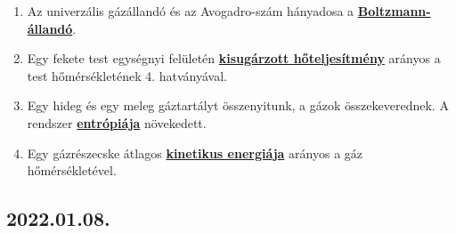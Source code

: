 \documentclass[../../fizika_kerdesek.tex]{subfiles}
\begin{document}
{\begin{enumerate}
                \item Az univerzális gázállandó és az Avogadro-szám hányadosa a \underline{\textbf{Boltzmann-állandó}}.
                \item Egy fekete test egységnyi felületén \underline{\textbf{kisugárzott hőteljesítmény}} arányos a test hőmérsékletének 4. hatványával.
                \item Egy hideg és egy meleg gáztartályt összenyitunk, a gázok összekeverednek. A rendszer \underline{\textbf{entrópiája}} növekedett.
                \item Egy gázrészecske átlagos \underline{\textbf{kinetikus energiája}} arányos a gáz hőmérsékletével.
            \end{enumerate}}

    \subsection{2022.01.08.}
\end{document}
